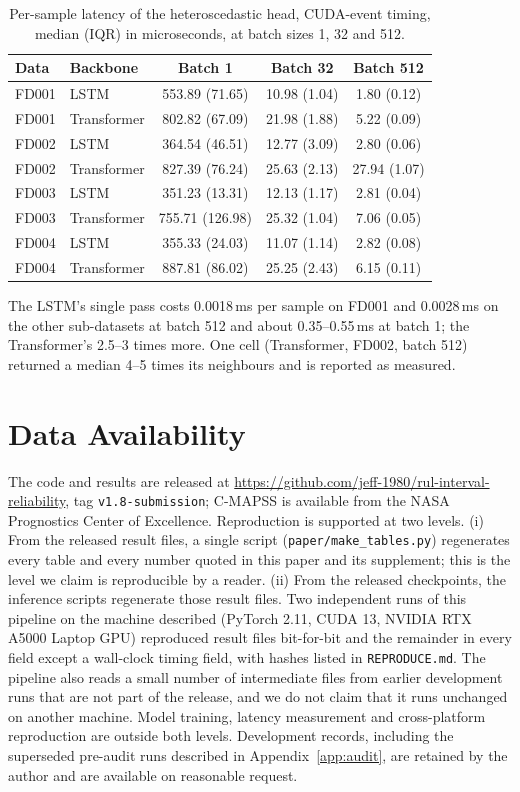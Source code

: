 \documentclass[journal]{IEEEtran}
\begin{document}
\begin{table}[!t]
\caption{Per-sample latency of the heteroscedastic head, CUDA-event timing, median (IQR) in microseconds, at batch sizes 1, 32 and 512.}
\label{tab:latency}
\centering\small
\begin{tabular}{llccc}
\toprule
Data & Backbone & Batch 1 & Batch 32 & Batch 512 \\
\midrule
FD001 & LSTM & 553.89 (71.65) & 10.98 (1.04) & 1.80 (0.12) \\
FD001 & Transformer & 802.82 (67.09) & 21.98 (1.88) & 5.22 (0.09) \\
FD002 & LSTM & 364.54 (46.51) & 12.77 (3.09) & 2.80 (0.06) \\
FD002 & Transformer & 827.39 (76.24) & 25.63 (2.13) & 27.94 (1.07) \\
FD003 & LSTM & 351.23 (13.31) & 12.13 (1.17) & 2.81 (0.04) \\
FD003 & Transformer & 755.71 (126.98) & 25.32 (1.04) & 7.06 (0.05) \\
FD004 & LSTM & 355.33 (24.03) & 11.07 (1.14) & 2.82 (0.08) \\
FD004 & Transformer & 887.81 (86.02) & 25.25 (2.43) & 6.15 (0.11) \\
\bottomrule
\end{tabular}
\end{table}

The LSTM's single pass costs 0.0018\,ms per sample on FD001 and 0.0028\,ms on the other sub-datasets at batch 512 and about 0.35--0.55\,ms at batch 1; the Transformer's 2.5--3 times more. One cell (Transformer, FD002, batch 512) returned a median 4--5 times its neighbours and is reported as measured.

\section*{Data Availability}
The code and results are released at \url{https://github.com/jeff-1980/rul-interval-reliability}, tag \texttt{v1.8-submission}; C-MAPSS is available from the NASA Prognostics Center of Excellence. Reproduction is supported at two levels. (i) From the released result files, a single script (\texttt{paper/make\_tables.py}) regenerates every table and every number quoted in this paper and its supplement; this is the level we claim is reproducible by a reader. (ii) From the released checkpoints, the inference scripts regenerate those result files. Two independent runs of this pipeline on the machine described (PyTorch 2.11, CUDA 13, NVIDIA RTX A5000 Laptop GPU) reproduced \NReproBit{} result files bit-for-bit and the remainder in every field except a wall-clock timing field, with hashes listed in \texttt{REPRODUCE.md}. The pipeline also reads a small number of intermediate files from earlier development runs that are not part of the release, and we do not claim that it runs unchanged on another machine. Model training, latency measurement and cross-platform reproduction are outside both levels. Development records, including the superseded pre-audit runs described in Appendix~\ref{app:audit}, are retained by the author and are available on reasonable request.



\end{document}
